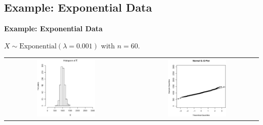 \documentclass[compress]{beamer}        %
\makeatletter
\newcommand{\tcb}{\textcolor{beamer@blendedblue}}
\makeatother
\begin{document}
\subsection{Example: Exponential Data}
\begin{frame}{\bf \tcb{Example: Exponential Data}}

$X \sim \text{Exponential}(\lambda=0.001)$ with $\boxed{n=60}$.

\begin{adjustwidth}{-0.2cm}{}
\begin{tabular}{c@{}c@{}c}
\includegraphics[width=0.5\textwidth, trim = 0.0cm 0.5cm 0.3cm 0.5cm, clip]{ExpHist60}
&&
\includegraphics[width=0.5\textwidth, trim = 0.0cm 0.5cm 0.3cm 0.5cm, clip]{ExpNorm60}
\end{tabular}
\end{adjustwidth}

\end{frame}
\end{document}
